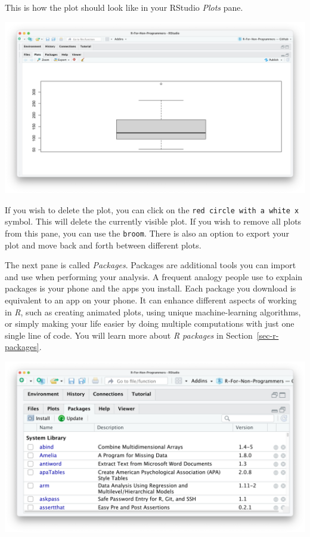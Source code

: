 \documentclass[
  letterpaper,
]{krantz}
\begin{document}
This is how the plot should look like in your RStudio \emph{Plots} pane.

\includegraphics{images/chapter_04_img/05_files_plots_etc/02_rstudio_plots.png}

If you wish to delete the plot, you can click on the
\texttt{red\ circle\ with\ a\ white\ x} symbol. This will delete the
currently visible plot. If you wish to remove all plots from this pane,
you can use the \texttt{broom}. There is also an option to export your
plot and move back and forth between different plots.

The next pane is called \emph{Packages}. Packages are additional tools
you can import and use when performing your analysis. A frequent analogy
people use to explain packages is your phone and the apps you install.
Each package you download is equivalent to an app on your phone. It can
enhance different aspects of working in \emph{R}, such as creating
animated plots, using unique machine-learning algorithms, or simply
making your life easier by doing multiple computations with just one
single line of code. You will learn more about \emph{R packages} in
Section~\ref{sec-r-packages}.

\includegraphics{images/chapter_04_img/05_files_plots_etc/03_rstudio_packages.png}
\end{document}

